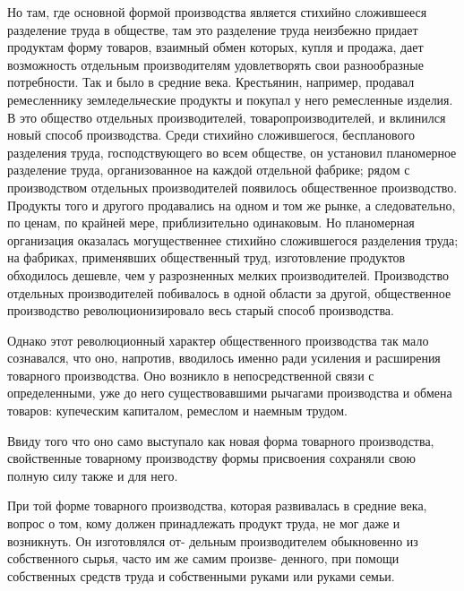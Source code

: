 \documentclass[12pt]{article}
\newcommand{\parnum}{(\arabic{parcount})}
\newcounter{parcount}
\newenvironment{parnumbers}{%
  \par%
  \everypar{\noindent \stepcounter{parcount}\marginpar[]{\parnum}}%
}{}
\begin{document}
\begin{parnumbers}
    Но там, где основной формой производства является стихийно сложившееся разделение труда в обществе, там это разделение труда неизбежно придает продуктам форму товаров, взаимный обмен которых, купля и продажа, дает возможность отдельным производителям удовлетворять свои разнообразные потребности. Так и было в средние века. Крестьянин, например, продавал ремесленнику земледельческие продукты и покупал у него ремесленные изделия. В это общество отдельных производителей, товаропроизводителей, и вклинился новый способ производства. Среди стихийно сложившегося, беспланового разделения труда, господствующего во всем обществе, он установил планомерное разделение труда, организованное на каждой отдельной фабрике; рядом с производством отдельных производителей появилось общественное производство. Продукты того и другого продавались на одном и том же рынке, а следовательно, по ценам, по крайней мере, приблизительно одинаковым. Но планомерная организация оказалась могущественнее стихийно сложившегося разделения труда; на фабриках, применявших общественный труд, изготовление продуктов обходилось дешевле, чем у разрозненных мелких производителей. Производство отдельных производителей побивалось в одной области за другой, общественное производство революционизировало весь старый способ производства.

    Однако этот революционный характер общественного производства так мало сознавался, что оно, напротив, вводилось именно ради усиления и расширения товарного производства. Оно возникло в непосредственной связи с определенными, уже до него существовавшими рычагами производства и обмена товаров: купеческим капиталом, ремеслом и наемным трудом.

    Ввиду того что оно само выступало как новая форма товарного производства, свойственные товарному производству формы присвоения сохраняли свою полную силу также и для него.

    При той форме товарного производства, которая развивалась в средние века, вопрос о том, кому должен принадлежать продукт труда, не мог даже и возникнуть. Он изготовлялся от- дельным производителем обыкновенно из собственного сырья, часто им же самим произве- денного, при помощи собственных средств труда и собственными руками или руками семьи.


\end{parnumbers}
\end{document}

